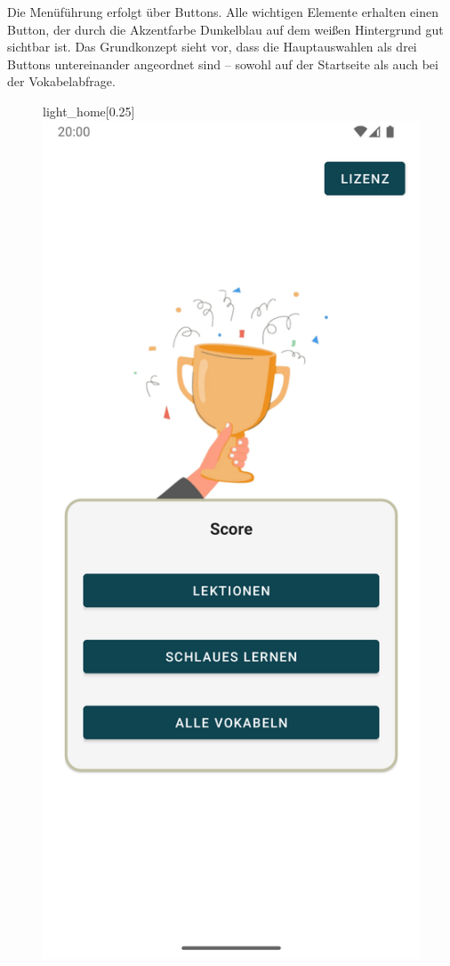 \documentclass[12pt,a4paper]{article}
\begin{document}
Die Menüführung erfolgt über Buttons. Alle wichtigen Elemente erhalten einen Button, der durch die Akzentfarbe Dunkelblau auf dem weißen Hintergrund gut sichtbar ist. Das Grundkonzept sieht vor, dass die Hauptauswahlen als drei Buttons untereinander angeordnet sind – sowohl auf der Startseite als auch bei der Vokabelabfrage.

\begin{figure}[h]
    \centering
    \begin{subcaptionbox}{light\_home\label{fig:bild1}}[0.25\linewidth]
        {\includegraphics[width=\linewidth]{showcase/light_home.png}}

\end{subcaptionbox}
\end{figure}
\end{document}
